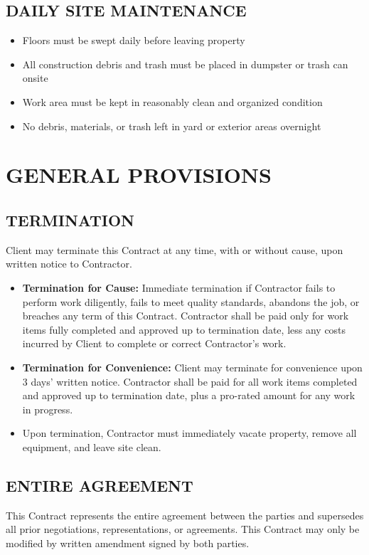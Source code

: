 \documentclass[10pt,letterpaper]{article}
\begin{document}
\subsection{DAILY SITE MAINTENANCE}
\begin{itemize}[leftmargin=*]
\item Floors must be swept daily before leaving property
\item All construction debris and trash must be placed in dumpster or trash can onsite
\item Work area must be kept in reasonably clean and organized condition
\item No debris, materials, or trash left in yard or exterior areas overnight
\end{itemize}

\section{GENERAL PROVISIONS}

\subsection{TERMINATION}
Client may terminate this Contract at any time, with or without cause, upon written notice to Contractor.
\begin{itemize}[leftmargin=*]
\item \textbf{Termination for Cause:} Immediate termination if Contractor fails to perform work diligently, fails to meet quality standards, abandons the job, or breaches any term of this Contract. Contractor shall be paid only for work items fully completed and approved up to termination date, less any costs incurred by Client to complete or correct Contractor's work.
\item \textbf{Termination for Convenience:} Client may terminate for convenience upon 3 days' written notice. Contractor shall be paid for all work items completed and approved up to termination date, plus a pro-rated amount for any work in progress.
\item Upon termination, Contractor must immediately vacate property, remove all equipment, and leave site clean.
\end{itemize}

\subsection{ENTIRE AGREEMENT}
This Contract represents the entire agreement between the parties and supersedes all prior negotiations, representations, or agreements. This Contract may only be modified by written amendment signed by both parties.
\end{document}
